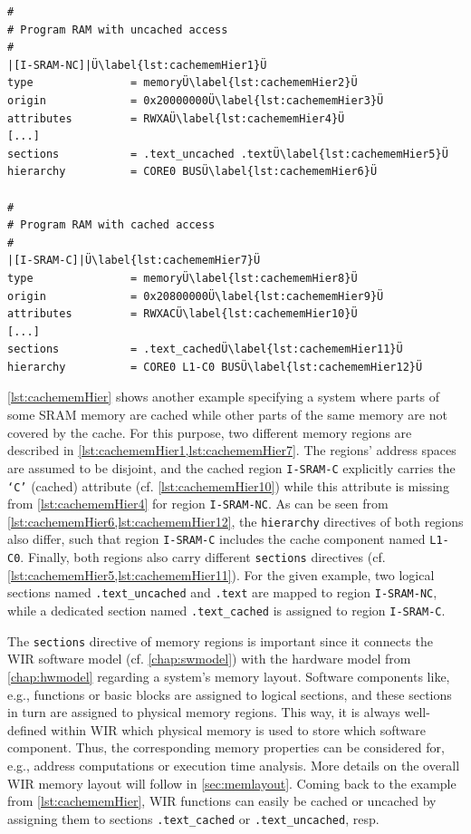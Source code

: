 \begin{lstlisting}[style=commandline,float=!b,caption={Example for Cached and Uncached Memory Hierarchy Configuration},label=lst:cachememHier]
#
# Program RAM with uncached access
#
|[I-SRAM-NC]|Ü\label{lst:cachememHier1}Ü
type               = memoryÜ\label{lst:cachememHier2}Ü
origin             = 0x20000000Ü\label{lst:cachememHier3}Ü
attributes         = RWXAÜ\label{lst:cachememHier4}Ü
[...]
sections           = .text_uncached .textÜ\label{lst:cachememHier5}Ü
hierarchy          = CORE0 BUSÜ\label{lst:cachememHier6}Ü

#
# Program RAM with cached access
#
|[I-SRAM-C]|Ü\label{lst:cachememHier7}Ü
type               = memoryÜ\label{lst:cachememHier8}Ü
origin             = 0x20800000Ü\label{lst:cachememHier9}Ü
attributes         = RWXACÜ\label{lst:cachememHier10}Ü
[...]
sections           = .text_cachedÜ\label{lst:cachememHier11}Ü
hierarchy          = CORE0 L1-C0 BUSÜ\label{lst:cachememHier12}Ü
\end{lstlisting}

\cref{lst:cachememHier} shows another example specifying a system where parts of some \gls{SRAM} memory are cached while other parts of the same memory are not covered by the cache.
For this purpose, two different memory regions are described in \cref{lst:cachememHier1,lst:cachememHier7}.
The regions' address spaces are assumed to be disjoint, and the cached region \texttt{I-SRAM-C} explicitly carries the \texttt{`C'} (cached) attribute (cf. \cref{lst:cachememHier10}) while this attribute is missing from \cref{lst:cachememHier4} for region \texttt{I-SRAM-NC}.
As can be seen from \cref{lst:cachememHier6,lst:cachememHier12}, the \texttt{hierarchy} directives of both regions also differ, such that region \texttt{I-SRAM-C} includes the cache component named \texttt{L1-C0}.
Finally, both regions also carry different \texttt{sections} directives (cf. \cref{lst:cachememHier5,lst:cachememHier11}).
For the given example, two logical sections named \texttt{.text\_uncached} and \texttt{.text} are mapped to region \texttt{I-SRAM-NC}, while a dedicated section named \texttt{.text\_cached} is assigned to region \texttt{I-SRAM-C}.

The \texttt{sections} directive of memory regions is important since it connects the \gls{WIR} software model (cf. \cref{chap:swmodel}) with the hardware model from \cref{chap:hwmodel} regarding a system's memory layout.
Software components like, e.g., functions or basic blocks are assigned to logical sections, and these sections in turn are assigned to physical memory regions.
This way, it is always well-defined within \gls{WIR} which physical memory is used to store which software component.
Thus, the corresponding memory properties can be considered for, e.g., address computations or execution time analysis.
More details on the overall \gls{WIR} memory layout will follow in \cref{sec:memlayout}.
Coming back to the example from \cref{lst:cachememHier}, \gls{WIR} functions can easily be cached or uncached by assigning them to sections \texttt{.text\_cached} or \texttt{.text\_uncached}, resp.


